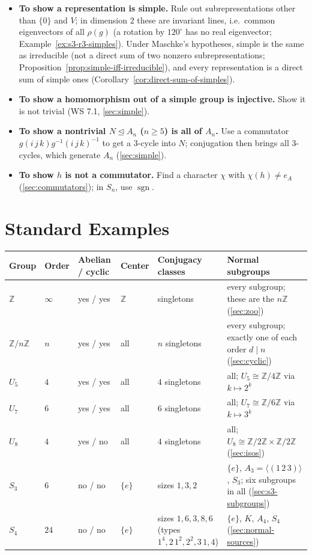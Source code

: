 \documentclass[11pt]{report}
\newcommand{\sgn}{\operatorname{sgn}}
\begin{document}
\begin{itemize}
    \item \textbf{To show a representation is simple.} Rule out subrepresentations other than $\{0\}$ and $V$; in dimension $2$ these are invariant lines, i.e.\ common eigenvectors of all $\rho(g)$ (a rotation by $120^\circ$ has no real eigenvector; Example~\ref{ex:s3-r3-simples}). Under Maschke's hypotheses, simple is the same as irreducible (not a direct sum of two nonzero subrepresentations; Proposition~\ref{prop:simple-iff-irreducible}), and every representation is a direct sum of simple ones (Corollary~\ref{cor:direct-sum-of-simples}).
    \item \textbf{To show a homomorphism out of a simple group is injective.} Show it is not trivial (WS 7.1, \ref{sec:simple}).
    \item \textbf{To show a nontrivial $N \trianglelefteq A_n$ ($n \geq 5$) is all of $A_n$.} Use a commutator $g(i\,j\,k)g^{-1}(i\,j\,k)^{-1}$ to get a $3$-cycle into $N$; conjugation then brings all $3$-cycles, which generate $A_n$ (\ref{sec:simple}).
    \item \textbf{To show $h$ is not a commutator.} Find a character $\chi$ with $\chi(h) \neq e_A$ (\ref{sec:commutators}); in $S_n$, use $\sgn$.
\end{itemize}

\section*{Standard Examples}
{}\label{sec:standard-examples}

{\small\renewcommand{\arraystretch}{1.25}
\begin{longtable}{p{2.3cm}p{1.2cm}p{1.9cm}p{1.9cm}p{3.1cm}p{3.3cm}}
\textbf{Group} & \textbf{Order} & \textbf{Abelian / cyclic} & \textbf{Center} & \textbf{Conjugacy classes} & \textbf{Normal subgroups} \\ \hline
$\mathbb{Z}$ & $\infty$ & yes / yes & $\mathbb{Z}$ & singletons & every subgroup; these are the $n\mathbb{Z}$ (\ref{sec:zoo}) \\
$\mathbb{Z}/n\mathbb{Z}$ & $n$ & yes / yes & all & $n$ singletons & every subgroup; exactly one of each order $d \mid n$ (\ref{sec:cyclic}) \\
$U_5$ & $4$ & yes / yes & all & $4$ singletons & all; $U_5 \cong \mathbb{Z}/4\mathbb{Z}$ via $k \mapsto 2^k$ \\
$U_7$ & $6$ & yes / yes & all & $6$ singletons & all; $U_7 \cong \mathbb{Z}/6\mathbb{Z}$ via $k \mapsto 3^k$ \\
$U_8$ & $4$ & yes / no & all & $4$ singletons & all; $U_8 \cong \mathbb{Z}/2\mathbb{Z} \times \mathbb{Z}/2\mathbb{Z}$ (\ref{sec:isos}) \\
$S_3$ & $6$ & no / no & $\{e\}$ & sizes $1, 3, 2$ & $\{e\}$, $A_3 = \langle (1\,2\,3) \rangle$, $S_3$; six subgroups in all (\ref{sec:s3-subgroups}) \\
$S_4$ & $24$ & no / no & $\{e\}$ & sizes $1, 6, 3, 8, 6$ (types $1^4, 2\,1^2, 2^2, 3\,1, 4$) & $\{e\}$, $K$, $A_4$, $S_4$ (\ref{sec:normal-sources}) \\
\end{longtable}}
\end{document}
